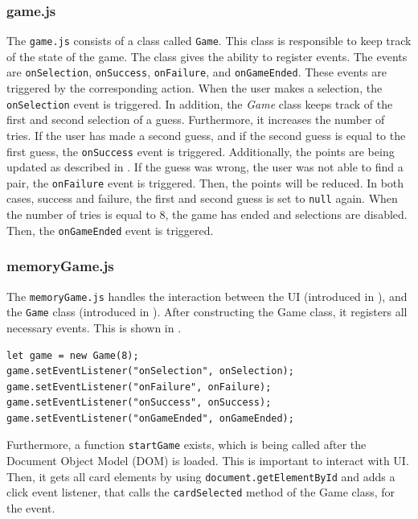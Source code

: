 \subsubsection{game.js}\label{subsubsec:03_impl_frontend_index}
The \texttt{game.js} consists of a class called \texttt{Game}. This class is responsible to keep track of the state of the game.
The class gives the ability to register events. The events are \texttt{onSelection}, \texttt{onSuccess}, \texttt{onFailure}, and \texttt{onGameEnded}. These events are triggered by the corresponding action.
When the user makes a selection, the \texttt{onSelection} event is triggered. In addition, the \textit{Game} class keeps track of the first and second selection of a guess. Furthermore, it increases the number of tries.
If the user has made a second guess, and if the second guess is equal to the first guess, the \texttt{onSuccess} event is triggered. Additionally, the points are being updated as described in .
If the guess was wrong, the user was not able to find a pair, the \texttt{onFailure} event is triggered. Then, the points will be reduced.
In both cases, success and failure, the first and second guess is set to \texttt{null} again.
%
When the number of tries is equal to 8, the game has ended and selections are disabled. Then, the \texttt{onGameEnded} event is triggered.

\subsubsection{memoryGame.js}\label{subsubsec:03_impl_frontend_memGame}
The \texttt{memoryGame.js} handles the interaction between the UI (introduced in ), and the \texttt{Game} class (introduced in ).
After constructing the Game class, it registers all necessary events. This is shown in .
\begin{lstlisting}[label=lst:03_impl_frontend_memGame_events, caption=Register all events]
let game = new Game(8);
game.setEventListener("onSelection", onSelection);
game.setEventListener("onFailure", onFailure);
game.setEventListener("onSuccess", onSuccess);
game.setEventListener("onGameEnded", onGameEnded);
\end{lstlisting}


Furthermore, a function \texttt{startGame} exists, which is being called after the Document Object Model (DOM) is loaded. This is important to interact with UI. Then, it gets all card elements by using \texttt{document.getElementById} and adds a click event listener, that calls the \texttt{cardSelected} method of the Game class, for the event.

